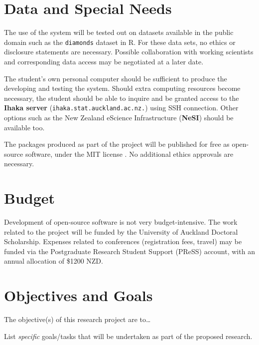 \documentclass[12pt,a4paper]{article}
\begin{document}
\section{Data and Special Needs}
\label{sec:data}

The use of the system will be tested out on datasets available in the public domain such as the \texttt{diamonds} dataset in R. For these data sets, no ethics or disclosure statements are necessary. Possible collaboration with working scientists and corresponding data access may be negotiated at a later date.  

The student's own personal computer should be sufficient to produce the developing and testing the system. Should extra computing resources become necessary, the student should be able to inquire and be granted access to the \textbf{Ihaka server} (\texttt{ihaka.stat.auckland.ac.nz.}) using SSH connection. Other options such as the New Zealand eScience Infrastructure (\textbf{NeSI}) should be available too. 

The packages produced as part of the project will be published for free as open-source software, under the MIT license \citep{mit2023}. No additional ethics approvals are necessary. 

\section{Budget}

Development of open-source software is not very budget-intensive. The work related to the project will be funded by the University of Auckland Doctoral Scholarship. Expenses related to conferences (registration fees, travel) may be funded via the Postgraduate Research Student Support (PReSS) account, with an annual allocation of \$1200 NZD. 

\section{Objectives and Goals}



The objective(s) of this research project are to\ldots



List \textit{specific} goals/tasks that
will be undertaken as part of the proposed research.
\end{document}
